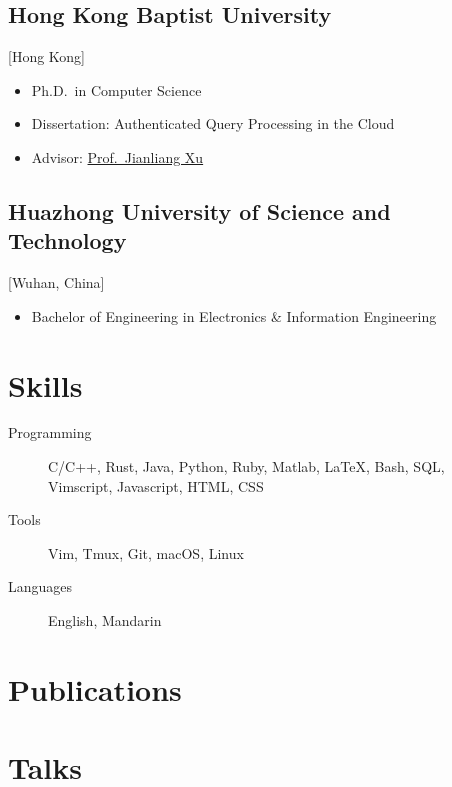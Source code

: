 \documentclass{mycv}
\begin{document}
\subsection{Hong Kong Baptist University}[Hong Kong]
\vspace{-\parskip}%
\begin{itemize}[label={}]
  \item Ph.D.\ in Computer Science 
  \item Dissertation: Authenticated Query Processing in the Cloud
  \item Advisor: \href{https://www.comp.hkbu.edu.hk/~xujl}{Prof.~Jianliang Xu}
\end{itemize}

\subsection{Huazhong University of Science and Technology}[Wuhan, China]
\vspace{-\parskip}%
\begin{itemize}[label={}]
  \item Bachelor of Engineering in Electronics \& Information Engineering 
\end{itemize}

\section{Skills}
\begin{description}
  \item[Programming]
        \parbox[t]{\linegoal}{
          \strut%
          C/C++, Rust, Java, Python, Ruby, Matlab, \LaTeX, Bash, SQL, Vimscript, Javascript, HTML, CSS
          \strut%
        }
  \item[Tools] Vim, Tmux, Git, macOS, Linux
  \item[Languages] English, Mandarin
\end{description}

\section{Publications}%


\section{Talks}
\end{document}
